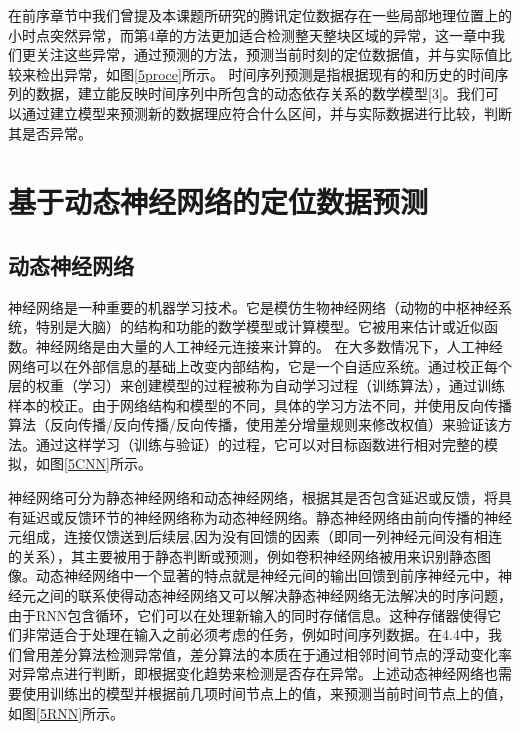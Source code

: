 \documentclass[a4paper,AutoFakeBold,oneside,12pt]{book}
\begin{document}
{{

	在前序章节中我们曾提及本课题所研究的腾讯定位数据存在一些局部地理位置上的小时点突然异常，而第4章的方法更加适合检测整天整块区域的异常，这一章中我们更关注这些异常，通过预测的方法，预测当前时刻的定位数据值，并与实际值比较来检出异常，如图\ref{5proce}所示。
	时间序列预测是指根据现有的和历史的时间序列的数据，建立能反映时间序列中所包含的动态依存关系的数学模型[3]。我们可以通过建立模型来预测新的数据理应符合什么区间，并与实际数据进行比较，判断其是否异常。


\section{基于动态神经网络的定位数据预测}
\subsection{动态神经网络}
	神经网络是一种重要的机器学习技术。它是模仿生物神经网络（动物的中枢神经系统，特别是大脑）的结构和功能的数学模型或计算模型。它被用来估计或近似函数。神经网络是由大量的人工神经元连接来计算的。
	在大多数情况下，人工神经网络可以在外部信息的基础上改变内部结构，它是一个自适应系统。通过校正每个层的权重（学习）来创建模型的过程被称为自动学习过程（训练算法），通过训练样本的校正。由于网络结构和模型的不同，具体的学习方法不同，并使用反向传播算法（反向传播/反向传播/反向传播，使用差分增量规则来修改权值）来验证该方法。通过这样学习（训练与验证）的过程，它可以对目标函数进行相对完整的模拟，如图\ref{5CNN}所示。


	神经网络可分为静态神经网络和动态神经网络，根据其是否包含延迟或反馈，将具有延迟或反馈环节的神经网络称为动态神经网络。静态神经网络由前向传播的神经元组成，连接仅馈送到后续层,因为没有回馈的因素（即同一列神经元间没有相连的关系），其主要被用于静态判断或预测，例如卷积神经网络被用来识别静态图像。动态神经网络中一个显著的特点就是神经元间的输出回馈到前序神经元中，神经元之间的联系使得动态神经网络又可以解决静态神经网络无法解决的时序问题，由于RNN包含循环，它们可以在处理新输入的同时存储信息。这种存储器使得它们非常适合于处理在输入之前必须考虑的任务，例如时间序列数据。在4.4中，我们曾用差分算法检测异常值，差分算法的本质在于通过相邻时间节点的浮动变化率对异常点进行判断，即根据变化趋势来检测是否存在异常。上述动态神经网络也需要使用训练出的模型并根据前几项时间节点上的值，来预测当前时间节点上的值，如图\ref{5RNN}所示。

}}
\end{document}
